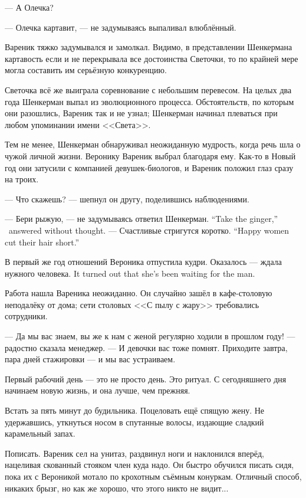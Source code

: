 --- А Олечка?

--- Олечка картавит, --- не задумываясь выпаливал влюблённый.

Вареник тяжко задумывался и замолкал.
Видимо, в представлении Шенкермана картавость если и не перекрывала все достоинства Светочки, то по крайней мере могла составить им серьёзную конкуренцию.

Светочка всё же выиграла соревнование с небольшим перевесом.
На целых два года Шенкерман выпал из эволюционного процесса.
Обстоятельств, по которым они разошлись, Вареник так и не узнал;
Шенкерман начинал плеваться при любом упоминании имени <<Света>>.

Тем не менее, Шенкерман обнаруживал неожиданную мудрость, когда речь шла о чужой личной жизни.
Веронику Вареник выбрал благодаря ему.
Как-то в Новый год они затусили с компанией девушек-биологов, и Вареник положил глаз сразу на троих.

--- Что скажешь? --- шепнул он другу, поделившись наблюдениями.

{--- Бери рыжую, --- не задумываясь ответил Шенкерман.}
{``Take the ginger,'' \Shenkerman\  answered without thought.}
{--- Счастливые стригутся коротко.}
{``Happy women cut their hair short.''}

В первый же год отношений Вероника отпустила кудри.
{Оказалось --- ждала нужного человека.}
{It turned out that she's been waiting for the man.}

\asterism

Работа нашла Вареника неожиданно.
Он случайно зашёл в кафе-столовую неподалёку от дома;
сети столовых <<С пылу с жару>> требовались сотрудники.

--- Да мы вас знаем, вы же к нам с женой регулярно ходили в прошлом году! --- радостно сказала менеджер.
--- И девочки вас тоже помнят.
Приходите завтра, пара дней стажировки --- и мы вас устраиваем.

\asterism

Первый рабочий день --- это не просто день.
Это ритуал.
С сегодняшнего дня начинаем новую жизнь, и она лучше, чем прежняя.

Встать за пять минут до будильника.
Поцеловать ещё спящую жену.
Не удержавшись, уткнуться носом в спутанные волосы, издающие сладкий карамельный запах.

Пописать.
Вареник сел на унитаз, раздвинул ноги и наклонился вперёд, нацеливая скованный стояком член куда надо.
Он быстро обучился писать сидя, пока их с Вероникой мотало по крохотным съёмным конуркам.
Отличный способ, никаких брызг, но как же хорошо, что этого никто не видит...

